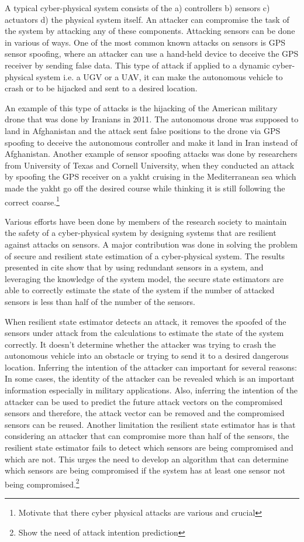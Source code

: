 \documentclass[conference]{IEEEtran}
\begin{document}
A typical cyber-physical system consists of the a) controllers b) sensors c) actuators d) the physical system itself. An attacker can compromise the task of the system by attacking any of these components. Attacking sensors can be done in various of ways. One of the most common known attacks on sensors is GPS sensor spoofing, where an attacker can use a hand-held device to deceive the GPS receiver by sending false data. This type of attack if applied to a dynamic cyber-physical system i.e. a UGV or a UAV, it can make the autonomous vehicle to crash or to be hijacked and sent to a desired location.

An example of this type of attacks is the hijacking of the American military drone that was done by Iranians in 2011. The autonomous drone was supposed to land in Afghanistan and the attack sent false positions to the drone via GPS spoofing to deceive the autonomous controller and make it land in Iran instead of Afghanistan. Another example of sensor spoofing attacks was done by researchers from University of Texas and Cornell University, when they conducted an attack by spoofing the GPS receiver on a yakht cruising in the Mediterranean sea which made the yakht go off the desired course while thinking it is still following the correct coarse.\footnote{Motivate that there cyber physical attacks are various and crucial}

Various efforts have been done by members of the research society to maintain the safety of a cyber-physical system by designing systems that are resilient against attacks on sensors. A major contribution was done in solving the problem of secure and resilient state estimation of a cyber-physical system. The results presented in cite show that by using redundant sensors in a system, and leveraging the knowledge of the system model, the secure state estimators are able to correctly estimate the state of the system if the number of attacked sensors is less than half of the number of the sensors.

When resilient state estimator detects an attack, it removes the spoofed of the sensors under attack from the calculations to estimate the state of the system correctly. It doesn't determine whether the attacker was trying to crash the autonomous vehicle into an obstacle or trying to send it to a desired dangerous location. Inferring the intention of the attacker can important for several reasons: In some cases, the identity of the attacker can be revealed which is an important information especially in military applications. Also, inferring the intention of the attacker can be used to predict the future attack vectors on the compromised sensors and therefore, the attack vector can be removed and the compromised sensors can be reused. Another limitation the resilient state estimator has is that considering an attacker that can compromise more than half of the sensors, the resilient state estimator fails to detect which sensors are being compromised and which are not. This urges the need to develop an algorithm that can determine which sensors are being compromised if the system has at least one sensor not being compromised.\footnote{Show the need of attack intention prediction}
\end{document}
